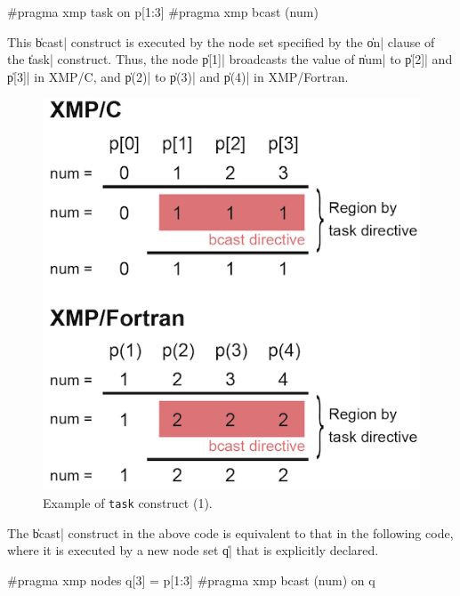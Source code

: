 \begin{XCexample}
#pragma xmp task on p[1:3]
{
#pragma xmp bcast (num)
}
\end{XCexample}


This \|bcast| construct is executed by the node set specified by the
\|on| clause of the \|task| construct. Thus, the node \|p[1]| broadcasts
the value of \|num| to \|p[2]| and \|p[3]| in XMP/C, and \|p(2)| to
\|p(3)| and \|p(4)| in XMP/Fortran.

\begin{figure}
  \centering
  \includegraphics{figs/task.png}
  \caption{Example of {\tt task} construct (1).}
\end{figure}

The \|bcast| construct in the above code is equivalent to that in the
following code, where it is executed by a new node set \|q| that is
explicitly declared.

\begin{XCexample}
#pragma xmp nodes q[3] = p[1:3]
#pragma xmp bcast (num) on q
\end{XCexample}

